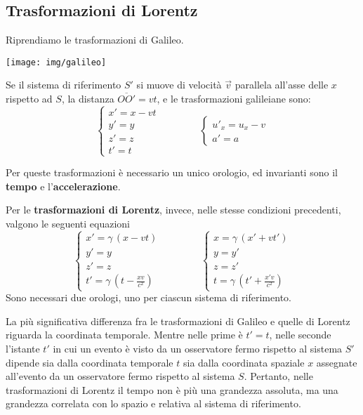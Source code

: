 \documentclass[a4paper, oneside]{article}
\newcounter{i}%
\newcounter{n}%
\begin{document}
\subsection{Trasformazioni di  Lorentz}

Riprendiamo le trasformazioni di Galileo.
\begin{center}
\texttt{[image: img/galileo]}
\end{center}
Se il sistema di riferimento $S'$ si muove di velocità $\vec{v}$ parallela all'asse delle $x$ rispetto ad $S$, la distanza $\overline{OO'}=vt$, e le trasformazioni galileiane sono:
\[\begin{cases}
x'=x-vt\\
y'=y\\
z'=z\\
t'=t
\end{cases}\qquad\qquad\begin{cases}
u'_x=u_x-v\\
a'=a
\end{cases}\]

Per queste trasformazioni è necessario un unico orologio, ed invarianti sono il \textbf{tempo} e l'\textbf{accelerazione}.

Per le \textbf{trasformazioni di Lorentz}, invece, nelle stesse condizioni precedenti, valgono le seguenti equazioni
\[\begin{cases}
x'=\gamma\,(x-vt)\\
y'=y\\
z'=z\\
t'=\gamma\,(t-\frac{xv}{c^2})
\end{cases}\qquad\qquad\begin{cases}
x=\gamma\,(x'+vt')\\
y=y'\\
z=z'\\
t=\gamma\,(t'+\frac{x'v}{c^2})
\end{cases}\]
Sono necessari due orologi, uno per ciascun sistema di riferimento.

La più significativa differenza fra le trasformazioni di Galileo e quelle di Lorentz riguarda la coordinata temporale. Mentre nelle prime è $t'=t$, nelle seconde l'istante $t'$ in cui un evento è visto da un osservatore fermo rispetto al sistema $S'$ dipende sia dalla coordinata temporale $t$ sia dalla coordinata spaziale $x$ assegnate all'evento da un osservatore fermo rispetto al sistema $S$. Pertanto, nelle trasformazioni di Lorentz il tempo non è più una grandezza assoluta, ma una grandezza correlata con lo spazio e relativa al sistema di riferimento.
\end{document}
